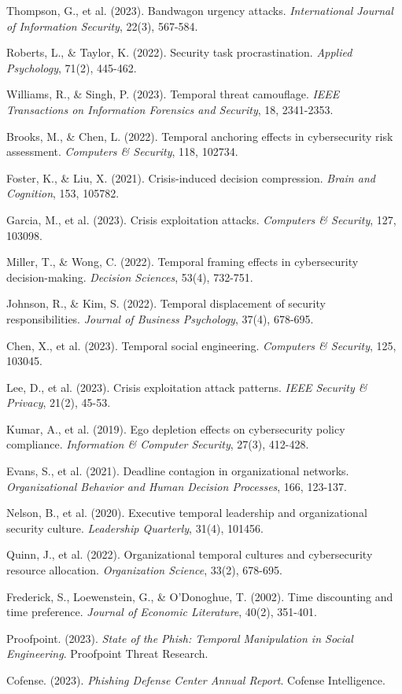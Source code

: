 \documentclass[11pt,a4paper]{article}
\begin{document}
\begin{thebibliography}{30}
Thompson, G., et al. (2023). Bandwagon urgency attacks. \textit{International Journal of Information Security}, 22(3), 567-584.

Roberts, L., \& Taylor, K. (2022). Security task procrastination. \textit{Applied Psychology}, 71(2), 445-462.

Williams, R., \& Singh, P. (2023). Temporal threat camouflage. \textit{IEEE Transactions on Information Forensics and Security}, 18, 2341-2353.

Brooks, M., \& Chen, L. (2022). Temporal anchoring effects in cybersecurity risk assessment. \textit{Computers \& Security}, 118, 102734.

Foster, K., \& Liu, X. (2021). Crisis-induced decision compression. \textit{Brain and Cognition}, 153, 105782.

Garcia, M., et al. (2023). Crisis exploitation attacks. \textit{Computers \& Security}, 127, 103098.

Miller, T., \& Wong, C. (2022). Temporal framing effects in cybersecurity decision-making. \textit{Decision Sciences}, 53(4), 732-751.

Johnson, R., \& Kim, S. (2022). Temporal displacement of security responsibilities. \textit{Journal of Business Psychology}, 37(4), 678-695.

Chen, X., et al. (2023). Temporal social engineering. \textit{Computers \& Security}, 125, 103045.

Lee, D., et al. (2023). Crisis exploitation attack patterns. \textit{IEEE Security \& Privacy}, 21(2), 45-53.

Kumar, A., et al. (2019). Ego depletion effects on cybersecurity policy compliance. \textit{Information \& Computer Security}, 27(3), 412-428.

Evans, S., et al. (2021). Deadline contagion in organizational networks. \textit{Organizational Behavior and Human Decision Processes}, 166, 123-137.

Nelson, B., et al. (2020). Executive temporal leadership and organizational security culture. \textit{Leadership Quarterly}, 31(4), 101456.

Quinn, J., et al. (2022). Organizational temporal cultures and cybersecurity resource allocation. \textit{Organization Science}, 33(2), 678-695.

Frederick, S., Loewenstein, G., \& O'Donoghue, T. (2002). Time discounting and time preference. \textit{Journal of Economic Literature}, 40(2), 351-401.

Proofpoint. (2023). \textit{State of the Phish: Temporal Manipulation in Social Engineering}. Proofpoint Threat Research.

Cofense. (2023). \textit{Phishing Defense Center Annual Report}. Cofense Intelligence.

\end{thebibliography}
\end{document}
